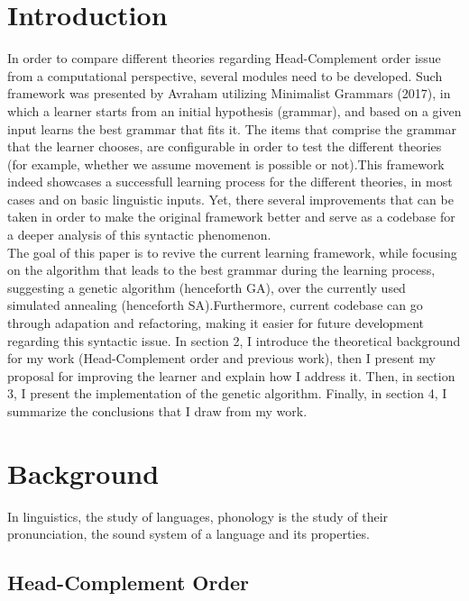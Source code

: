 \documentclass{article}
\begin{document}
\section{Introduction} 
In order to compare different theories regarding Head-Complement order issue from a computational perspective, several modules need to be developed. Such framework was presented by Avraham utilizing Minimalist Grammars (2017),  in which a learner starts from an initial hypothesis (grammar), and based on a given input learns the best grammar that fits it. The items that comprise the grammar that the learner chooses, are configurable in order to test the different theories (for example, whether we assume movement is possible or not).This framework indeed showcases a successfull learning process for the different theories, in most cases and on basic linguistic inputs. Yet,  there several improvements that can be taken in order to make the original framework better and serve as a codebase for a deeper analysis of this syntactic phenomenon. \\

The goal of this paper is to revive the current learning framework, while focusing on the algorithm that leads to the best grammar during the learning process, suggesting a genetic algorithm (henceforth GA), over the currently used simulated annealing (henceforth SA).Furthermore, current codebase can go through adapation and refactoring, making it easier for future development regarding this syntactic issue.
In section 2, I introduce the theoretical background for my work (Head-Complement order and previous work),  then I present my proposal for improving the learner and explain how I address it.  Then,  in section 3,  I present the implementation of the genetic algorithm. Finally,  in section 4,  I summarize the conclusions that I draw from my work.

\clearpage
\section{Background} 
In linguistics, the study of languages, phonology is the study of their pronunciation,  the sound system of a language and its properties.

\subsection{Head-Complement Order} %
\end{document}
